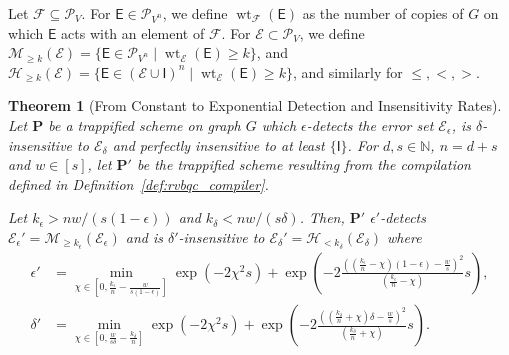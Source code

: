 \documentclass[12pt]{iopart}
\newcommand{\cptp}[1]{\mathsf{#1}} \newcommand{\pd}[1]{\mathcal{#1}}  \newcommand{\sch}[1]{\bm{#1}}
\newcommand{\Id}{\cptp{I}}
\renewcommand{\1}{\mathds{1}}
\newtheorem{theorem}{Theorem}
\begin{document}
Let $\mathcal F \subseteq \mathcal{P}_V$. For $\cptp E \in  \mathcal{P}_{V^n}$, we define $\operatorname{wt}_{\mathcal F}(\cptp E)$ as the number of copies of $G$ on which $\cptp E$ acts with an element of $\mathcal F$. 
For $\mathcal E \subset \mathcal{P}_V$, we define $\mathcal{M}_{\geq k}(\mathcal E) = \{ \cptp E \in \mathcal{P}_{V^n} \; | \; \operatorname{wt}_{\mathcal E} (\cptp E) \geq k \}$, 
and $\mathcal{H}_{\geq k}(\mathcal E) = \{ \cptp E \in (\mathcal E \cup \Id)^n \; | \; \operatorname{wt}_{\mathcal E} (\cptp E) \geq k\}$, and similarly for $\leq, <, >$.

\begin{theorem}[From Constant to Exponential Detection and Insensitivity Rates]\label{thm:boost}
  Let $\sch P$ be a trappified scheme on graph $G$ which $\epsilon$-detects the error set $\mathcal{E}_\epsilon$, is $\delta$-insensitive to $\mathcal{E}_\delta$ and perfectly insensitive to at least $\{\Id\}$.
  For $d, s \in \mathbb{N}$, $n = d + s$ and $w \in [s]$, let $\sch P'$ be the trappified scheme resulting from the compilation defined in Definition~\ref{def:rvbqc_compiler}.
  
   Let $k_\epsilon > nw/(s(1-\epsilon))$ and $k_\delta < nw/(s\delta)$. Then, $\sch P'$ $\epsilon'$-detects $\mathcal{E}_\epsilon' = \mathcal{M}_{\geq k_\epsilon}(\mathcal E_\epsilon)$ and is $\delta'$-insensitive to $\mathcal{E}_\delta' = \mathcal{H}_{< k_\delta}(\mathcal E_\delta)$ where
  \begin{align}
  	\epsilon' &= \min_{\chi \in \left[ 0, \frac{k_\epsilon}{n} - \frac{w}{s(1-\epsilon)} \right]} \exp \left( -2 \chi^2 s \right) + \exp \left( -2 \frac{\left(\left( \frac{k_\epsilon}{n} - \chi \right)(1-\epsilon) - \frac{w}{s}\right)^2}{\left( \frac{k_\epsilon}{n} - \chi \right)}s \right),\\
  	\delta' &= \min_{\chi \in \left[ 0, \frac{w}{s\delta} - \frac{k_\delta}{n} \right]} \exp \left( -2 \chi^2 s \right) + \exp \left( -2 \frac{\left(\left( \frac{k_\delta}{n} + \chi \right)\delta - \frac{w}{s}\right)^2}{\left( \frac{k_\delta}{n} + \chi \right)}s \right).
  \end{align}
\end{theorem}
\end{document}
